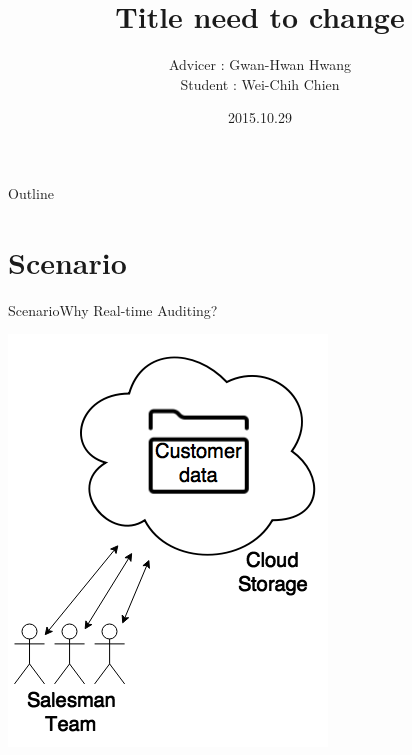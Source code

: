 \documentclass{beamer}
\title[Progress Report]{Title need to change}
\author[Wei-Chih Chien]{Advicer : Gwan-Hwan Hwang\\ Student : Wei-Chih Chien}
\institute[NTNU CSIE CCLAB]{NTNU CSIE CCLAB}
\date{2015.10.29}
\begin{document}
\begin{CJK}{UTF8}{bkai}
\begin{frame}
  \titlepage
\end{frame}

\begin{frame}{Outline}
  \tableofcontents
\end{frame}

\section{Scenario}
\begin{frame}{Scenario}{Why Real-time Auditing?}
	\begin{center}
	\includegraphics[width=.4\textwidth]{Scenario1.png}
	\end{center}
\end{frame}


\end{CJK}
\end{document}
